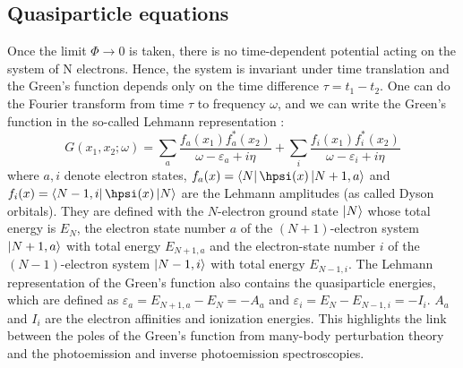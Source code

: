 \subsection{Quasiparticle equations}
Once the limit $\Phi \to 0$ is taken, there is no time-dependent potential acting on the system of N electrons. Hence, the system is invariant under time translation and the Green's function depends only on the time difference $\tau = t_1 - t_2$. One can do the Fourier transform from time $\tau$ to frequency $\omega$, and we can write the Green's function in the so-called Lehmann representation :
\begin{equation}
	G(x_1,x_2;\omega) = \sum_a \frac{f_a(x_1)f_a^*(x_2)}{\omega-\varepsilon_a + i\eta} + \sum_i \frac{f_i(x_1)f_i^*(x_2)}{\omega-\varepsilon_i + i\eta}
\end{equation}
where $a,i$ denote electron states, $f_a(x) = \bra{N}\hpsi(x)\ket{N+1,a}$ and $f_i(x) = \bra{N-1,i} \hpsi(x) \ket{N}$ are the Lehmann amplitudes (as called Dyson orbitals). They are defined with the $N$-electron ground state $\ket{N}$ whose total energy is $E_N$, the electron state number $a$ of the $(N+1)$-electron system $\ket{N+1,a}$ with total energy $E_{N+1,a}$ and the electron-state number $i$ of the $(N-1)$-electron system $\ket{N-1,i}$ with total energy $E_{N-1,i}$.
The Lehmann representation of the Green's function also contains the quasiparticle energies, which are defined as $\varepsilon_a = E_{N+1,a} - E_N = -A_a$ and $\varepsilon_i = E_N - E_{N-1,i} = -I_i$. $A_a$ and $I_i$ are the electron affinities and ionization energies. This highlights the link between the poles of the Green's function from many-body perturbation theory and the photoemission and inverse photoemission spectroscopies. 


